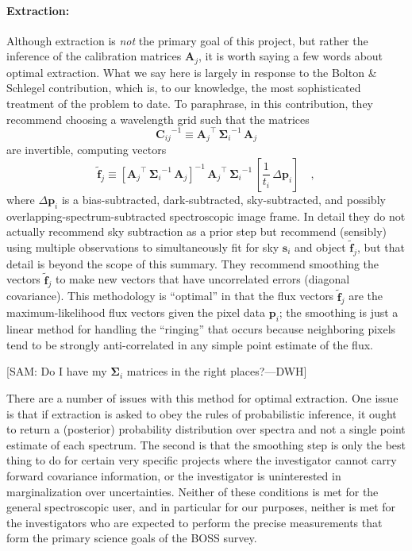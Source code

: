 \documentclass[12pt]{article}
\newcommand{\inverse}[1]{{#1}^{-1}}
\newcommand{\transpose}[1]{{#1}^{\scriptscriptstyle \top}}
\newcommand{\hmatrix}[1]{\boldsymbol{#1}}
\newcommand{\Amatrix}{\hmatrix{A}}
\newcommand{\pixels}{\hmatrix{p}}
\newcommand{\fluxLSF}{\hmatrix{\tilde{f}}}
\newcommand{\sky}{\hmatrix{s}}
\newcommand{\pixelvariance}{\hmatrix{\Sigma}}
\newcommand{\covariance}{\hmatrix{C}}
\begin{document}
\paragraph{Extraction:}
Although extraction is \emph{not} the primary goal of this project,
but rather the inference of the calibration matrices $\Amatrix_j$, it
is worth saying a few words about optimal extraction.  What we say
here is largely in response to the Bolton \& Schlegel contribution,
which is, to our knowledge, the most sophisticated treatment of the
problem to date.  To paraphrase, in this contribution, they recommend
choosing a wavelength grid such that the matrices
\begin{equation}
\inverse{\covariance_{ij}} \equiv
  \transpose{\Amatrix_j}\,\inverse{\pixelvariance_i}\,\Amatrix_j
\end{equation}
are invertible, computing vectors
\begin{equation}
\fluxLSF_j \equiv
  \inverse{[\transpose{\Amatrix_j}\,\inverse{\pixelvariance_i}\,\Amatrix_j]}
  \,\transpose{\Amatrix_j}\,\inverse{\pixelvariance_i}
  \,\left[\frac{1}{t_i}\,\Delta\pixels_i\right] \quad ,
\end{equation}
where $\Delta\pixels_i$ is a bias-subtracted, dark-subtracted,
sky-subtracted, and possibly overlapping-spectrum-subtracted
spectroscopic image frame.  In detail they do not actually recommend
sky subtraction as a prior step but recommend (sensibly) using
multiple observations to simultaneously fit for sky $\sky_i$ and
object $\fluxLSF_j$, but that detail is beyond the scope of this
summary.  They recommend smoothing the vectors $\fluxLSF_j$ to make
new vectors that have uncorrelated errors (diagonal covariance).  This
methodology is ``optimal'' in that the flux vectors $\fluxLSF_j$ are
the maximum-likelihood flux vectors given the pixel data $\pixels_i$;
the smoothing is just a linear method for handling the ``ringing''
that occurs because neighboring pixels tend to be strongly
anti-correlated in any simple point estimate of the flux.

[SAM: Do I have my $\pixelvariance_i$ matrices in the right places?---DWH]

There are a number of issues with this method for optimal extraction.
One issue is that if extraction is asked to obey the rules of
probabilistic inference, it ought to return a (posterior) probability
distribution over spectra and not a single point estimate of each
spectrum.  The second is that the smoothing step is only the best
thing to do for certain very specific projects where the investigator
cannot carry forward covariance information, or the investigator is
uninterested in marginalization over uncertainties.  Neither of these
conditions is met for the general spectroscopic user, and in
particular for our purposes, neither is met for the investigators who
are expected to perform the precise measurements that form the primary
science goals of the BOSS survey.
\end{document}
